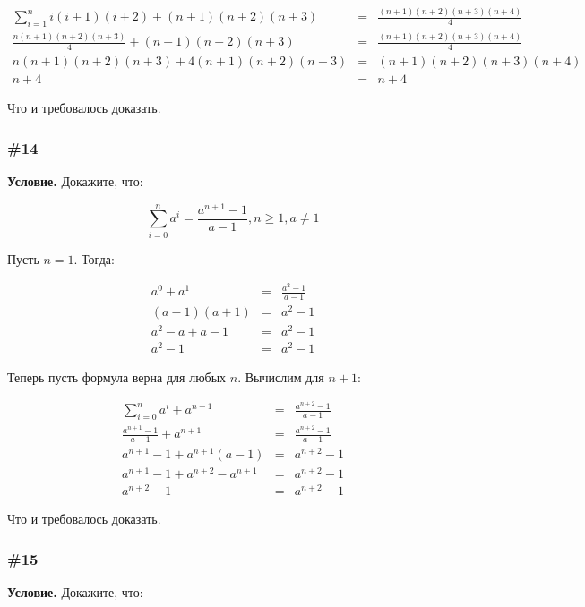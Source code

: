 \documentclass{article}
\begin{document}
\begin{eqnarray}
    \sum_{i=1}^n i(i+1)(i+2) + (n+1)(n+2)(n+3) &=& \frac{(n+1)(n+2)(n+3)(n+4)}{4}\\
    \frac{n(n+1)(n+2)(n+3)}{4} + (n+1)(n+2)(n+3) &=& \frac{(n+1)(n+2)(n+3)(n+4)}{4}\\
    n(n+1)(n+2)(n+3) + 4(n+1)(n+2)(n+3) &=& (n+1)(n+2)(n+3)(n+4)\\
    n+4 &=& n+4
\end{eqnarray}

Что и требовалось доказать.

\subsubsection{\#14}

\textbf{Условие.}
Докажите, что:

\begin{equation}
    \sum_{i=0}^n a^i = \frac{a^{n+1} - 1}{a - 1}, n \geqslant 1, a \neq 1
\end{equation}

Пусть \(n=1\). Тогда:

\begin{eqnarray}
    a^0 + a^1 &=& \frac{a^2 - 1}{a-1}\\
    (a - 1)(a + 1) &=& a^2 - 1\\
    a^2 -a + a -1 &=& a^2 - 1\\
    a^2 - 1 &=& a^2 - 1
\end{eqnarray}

Теперь пусть формула верна для любых \(n\).
Вычислим для \(n+1\):

\begin{eqnarray}
    \sum_{i=0}^n a^i + a^{n+1} &=& \frac{a^{n+2} - 1}{a - 1}\\
    \frac{a^{n+1} - 1}{a-1} + a^{n+1} &=& \frac{a^{n+2} - 1}{a - 1}\\
    a^{n+1} - 1 + a^{n+1}(a - 1) &=& a^{n+2} - 1\\
    a^{n+1} - 1 + a^{n+2} - a^{n+1} &=& a^{n+2} - 1\\
    a^{n+2} - 1 &=& a^{n+2} - 1
\end{eqnarray}

Что и требовалось доказать.

\subsubsection{\#15}

\textbf{Условие.}
Докажите, что:
\end{document}
